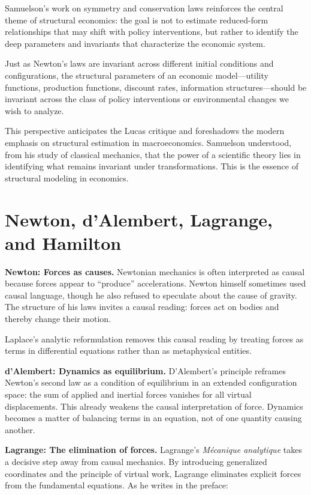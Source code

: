 \documentclass[12pt]{article}
\begin{document}
Samuelson's work on symmetry and conservation laws reinforces the central theme of structural economics: the goal is not to estimate reduced-form relationships that may shift with policy interventions, but rather to identify the deep parameters and invariants that characterize the economic system.

Just as Newton's laws are invariant across different initial conditions and configurations, the structural parameters of an economic model---utility functions, production functions, discount rates, information structures---should be invariant across the class of policy interventions or environmental changes we wish to analyze.

This perspective anticipates the Lucas critique and foreshadows the modern emphasis on structural estimation in macroeconomics. Samuelson understood, from his study of classical mechanics, that the power of a scientific theory lies in identifying what remains invariant under transformations. This is the essence of structural modeling in economics.




\section{Newton, d'Alembert, Lagrange, and Hamilton}

\textbf{Newton: Forces as causes.} Newtonian mechanics is often interpreted as causal because forces appear to ``produce'' accelerations. Newton himself sometimes used causal language, though he also refused to speculate about the cause of gravity. The structure of his laws invites a causal reading: forces act on bodies and thereby change their motion.

Laplace's analytic reformulation removes this causal reading by treating forces as terms in differential equations rather than as metaphysical entities.

\textbf{d'Alembert: Dynamics as equilibrium.} D'Alembert's principle reframes Newton's second law as a condition of equilibrium in an extended configuration space: the sum of applied and inertial forces vanishes for all virtual displacements. This already weakens the causal interpretation of force. Dynamics becomes a matter of balancing terms in an equation, not of one quantity causing another.

\textbf{Lagrange: The elimination of forces.} Lagrange's \emph{M\'ecanique analytique} takes a decisive step away from causal mechanics. By introducing generalized coordinates and the principle of virtual work, Lagrange eliminates explicit forces from the fundamental equations. As he writes in the preface:
\end{document}
